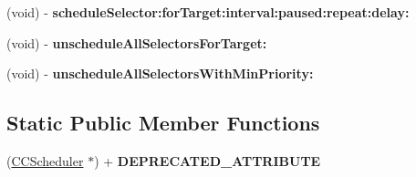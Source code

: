 \begin{DoxyCompactItemize}
\item 
\hypertarget{class_c_c_scheduler_a67547138cb359d0c40df1680a3da6048}{(void) -\/ {\bfseries schedule\-Selector\-:for\-Target\-:interval\-:paused\-:repeat\-:delay\-:}}\label{class_c_c_scheduler_a67547138cb359d0c40df1680a3da6048}

\item 
\hypertarget{class_c_c_scheduler_af4f426991590da0bec8c7d1e3ef175cd}{(void) -\/ {\bfseries unschedule\-All\-Selectors\-For\-Target\-:}}\label{class_c_c_scheduler_af4f426991590da0bec8c7d1e3ef175cd}

\item 
\hypertarget{class_c_c_scheduler_a2e3c5b8dbe1e568bc4570976e07e55a3}{(void) -\/ {\bfseries unschedule\-All\-Selectors\-With\-Min\-Priority\-:}}\label{class_c_c_scheduler_a2e3c5b8dbe1e568bc4570976e07e55a3}

\end{DoxyCompactItemize}
\subsection*{Static Public Member Functions}
\begin{DoxyCompactItemize}
\item 
\hypertarget{class_c_c_scheduler_a81e3a9622050656f2bc5e4ea524fd6f3}{(\hyperlink{class_c_c_scheduler}{C\-C\-Scheduler} $\ast$) + {\bfseries D\-E\-P\-R\-E\-C\-A\-T\-E\-D\-\_\-\-A\-T\-T\-R\-I\-B\-U\-T\-E}}\label{class_c_c_scheduler_a81e3a9622050656f2bc5e4ea524fd6f3}

\end{DoxyCompactItemize}
